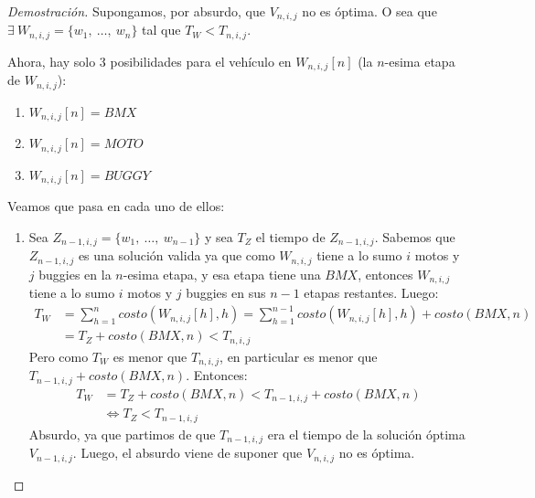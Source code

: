     \begin{proof}[Demostración]
        Supongamos, por absurdo, que $V_{n,i,j}$ no es óptima. O sea que $\exists\ W_{n,i,j} = \{w_1,\ \dots,\ w_{n}\}$ tal que $T_{W} < T_{n,i,j}$.

        Ahora, hay solo 3 posibilidades para el vehículo en $W_{n,i,j}[n]$ (la $n$-esima etapa de $W_{n,i,j}$):
        \begin{enumerate}
            \item $W_{n,i,j}[n] = BMX$
            \item $W_{n,i,j}[n] = MOTO$
            \item $W_{n,i,j}[n] = BUGGY$
        \end{enumerate}

        Veamos que pasa en cada uno de ellos:
        \begin{enumerate}
             \item Sea $Z_{n-1,i,j} = \{w_1,\ \dots,\ w_{n-1}\}$ y sea $T_{Z}$ el tiempo de $Z_{n-1,i,j}$. Sabemos que $Z_{n-1,i,j}$ es una solución valida ya que como $W_{n,i,j}$ tiene a lo sumo $i$ motos y $j$ buggies en la $n$-esima etapa, y esa etapa tiene una $BMX$, entonces $W_{n,i,j}$ tiene a lo sumo $i$ motos y $j$ buggies en sus $n-1$ etapas restantes. Luego:
                 \begin{equation*}
                 \begin{aligned}
                     T_{W} &= \sum_{h=1}^{n}{costo(W_{n,i,j}[h], h)} = \sum_{h=1}^{n-1}{costo(W_{n,i,j}[h], h)} + costo(BMX, n) \\
                           &= T_{Z} + costo(BMX, n) < T_{n,i,j}
                 \end{aligned}
                 \end{equation*}
                 Pero como $T_{W}$ es menor que $T_{n,i,j}$, en particular es menor que $T_{n-1,i,j} + costo(BMX, n)$. Entonces:
                 \begin{equation*}
                 \begin{aligned}
                     T_{W} &= T_{Z} + costo(BMX, n) < T_{n-1,i,j} + costo(BMX, n) \\
                           &\iff T_{Z} < T_{n-1,i,j}
                 \end{aligned}
                 \end{equation*}
                 Absurdo, ya que partimos de que $T_{n-1,i,j}$ era el tiempo de la solución óptima $V_{n-1,i,j}$. Luego, el absurdo viene de suponer que $V_{n,i,j}$ no es óptima.

\end{enumerate}
\end{proof}
